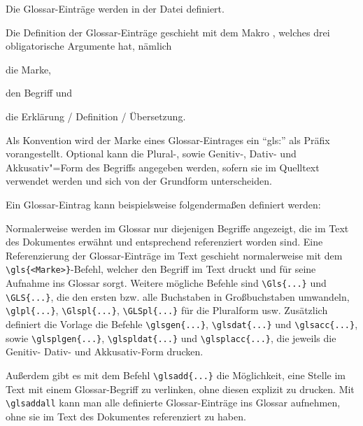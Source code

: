 Die Glossar-Einträge werden in der Datei   definiert.

Die Definition der Glossar-Einträge geschieht mit dem Makro ,
welches drei obligatorische Argumente hat, nämlich
\begin{itemize*}
\item die Marke,
\item den Begriff und
\item die Erklärung / Definition / Übersetzung.
\end{itemize*}
Als Konvention wird der Marke eines Glossar-Eintrages ein \enquote{gls:} als Präfix vorangestellt.
Optional kann die Plural-, sowie Genitiv-, Dativ- und Akkusativ"=Form des Begriffs angegeben werden,
sofern sie im Quelltext verwendet werden und sich von der Grundform unterscheiden.

Ein Glossar-Eintrag kann beispielsweise folgendermaßen definiert werden:
\begin{latex}[caption={Definition eines Glossar-Eintrages},label={lst:GlossEntry}]
\end{latex}

Normalerweise werden im Glossar nur diejenigen Begriffe angezeigt,
die im Text des Dokumentes erwähnt und entsprechend referenziert worden sind.
Eine Referenzierung der Glossar-Einträge im Text geschieht normalerweise mit dem
\lstinline|\gls{<Marke>}|-Befehl,
welcher den Begriff im Text druckt und für seine Aufnahme ins Glossar sorgt.
Weitere mögliche Befehle sind \lstinline|\Gls{...}| und \lstinline|\GLS{...}|,
die den ersten bzw. alle Buchstaben in Großbuchstaben umwandeln,
\lstinline|\glpl{...}|, \lstinline|\Glspl{...}|, \lstinline|\GLSpl{...}|
für die Pluralform usw.
Zusätzlich definiert die Vorlage die Befehle
\lstinline|\glsgen{...}|, \lstinline|\glsdat{...}| und \lstinline|\glsacc{...}|,
sowie
\lstinline|\glsplgen{...}|, \lstinline|\glspldat{...}| und \lstinline|\glsplacc{...}|,
die jeweils die Genitiv- Dativ- und Akkusativ-Form drucken.

Außerdem gibt es mit dem Befehl \lstinline|\glsadd{...}| die Möglichkeit,
eine Stelle im Text mit einem Glossar-Begriff zu verlinken, ohne diesen explizit zu drucken.
Mit \lstinline|\glsaddall| kann man alle definierte Glossar-Einträge ins Glossar aufnehmen,
ohne sie im Text des Dokumentes referenziert zu haben.

